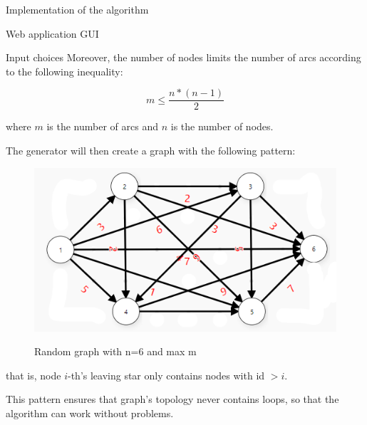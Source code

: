 \documentclass[9pt]{extarticle}
\begin{document}
\begin{section}{Implementation of the algorithm}
\begin{subsection}{Web application GUI}
\begin{subsubsection}{Input choices}
                Moreover, the number of nodes limits the number of arcs according to the following inequality:

                $$
                    m \leq \frac{n * (n-1)}{2}
                $$
                
                where $m$ is the number of arcs and $n$ is the number of nodes.

                The generator will then create a graph with the following pattern:
                
                \begin{figure}[h]
                    \includegraphics[scale=0.6]{graph2.png}
                    \centering
                    \begin{description}
                        \centering
                        \item[Figure 3] Random graph with n=6 and max m
                    \end{description}
                \end{figure}

                that is, node $i$-th's leaving star only contains nodes with id $> i$.

                This pattern ensures that graph's topology never contains loops, so that the algorithm can work without problems. 


            \end{subsubsection}


\end{subsection}
\end{section}
\end{document}
